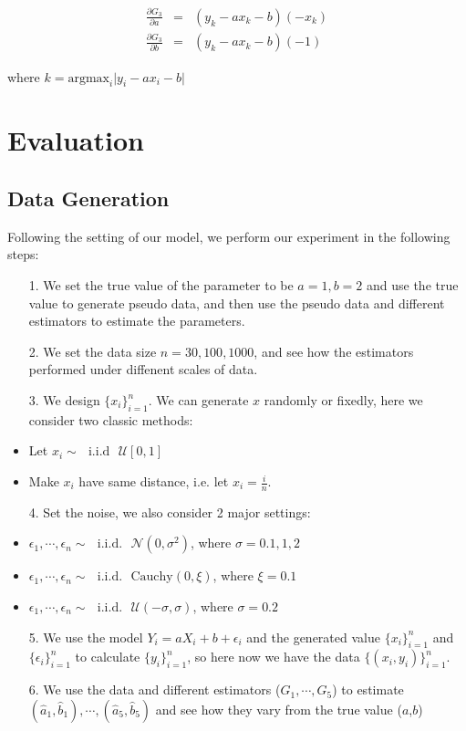 \documentclass[twoside]{article}
\begin{document}
\begin{eqnarray}
  \frac{\partial G_3}{\partial a}&=&(y_k-a x_k - b)(-x_k) \\
  \frac{\partial G_3}{\partial b}&=&(y_k-a x_k - b)(-1) 
\end{eqnarray}

where $k = \mathrm{argmax}_i \lvert y_i - a x_i - b\rvert$

\section{Evaluation}

\subsection{Data Generation}

\label{process}

Following the setting of our model, we perform our experiment in the following steps:

\begin{itemize}
  \item[1.] We set the true value of the parameter to be $a=1, b=2$ and use the true value to generate pseudo data, and then use the pseudo data and different estimators to estimate the parameters.
  \item[2.] We set the data size $n=30, 100, 1000$, and see how the estimators performed under diffenent scales of data.
  \item[3.] We design $\{x_i\}_{i=1}^n$. We can generate $x$ randomly or fixedly, here we consider two classic methods:
        \item Let $x_i \sim\text{ }\mathrm{i.i.d}\textbf{ }\mathcal{U}[0, 1]$
        \item Make $x_i$ have same distance, i.e. let $x_i = \frac{i}{n}$.
  \item[4.] Set the noise, we also consider 2 major settings:
        \item $\epsilon_1, \cdots, \epsilon_n \sim\text{ }\mathrm{i.i.d.} \text{ }\mathcal{N}(0,\sigma^2)$, where $\sigma=0.1,1,2$
        \item $\epsilon_1, \cdots, \epsilon_n \sim\text{ }\mathrm{i.i.d.} \text{ }\mathrm{Cauchy}(0,\xi)$, where $\xi=0.1$
        \item $\epsilon_1, \cdots, \epsilon_n \sim\text{ }\mathrm{i.i.d.} \text{ }\mathcal{U}(-\sigma,\sigma)$, where $\sigma=0.2$
  \item[5.] We use the model $Y_i=a X_i + b + \epsilon_i$ and the generated value $\{x_i\}_{i=1}^n$ and $\{\epsilon_i\}_{i=1}^n$ to calculate $\{y_i\}_{i=1}^n$, so here now we have the data $\{(x_i,y_i)\}_{i=1}^n$.
  \item[6.] We use the data and different estimators ($G_1,\cdots,G_5$) to estimate $(\hat{a}_1,\hat{b}_1),\cdots,(\hat{a}_5,\hat{b}_5)$ and see how they vary from the true value ($a$,$b$)
\end{itemize}
\end{document}
